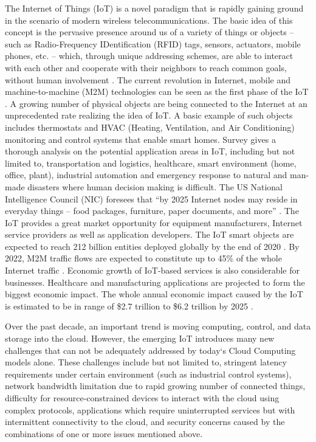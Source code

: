 The Internet of Things (IoT) is a novel paradigm that is rapidly gaining ground in the scenario of modern wireless telecommunications. The basic idea of this concept is the pervasive presence around us of a variety of things or objects -- such as Radio-Frequency IDentification (RFID) tags, sensors, actuators, mobile phones, etc. -- which, through unique addressing schemes, are able to interact with each other and cooperate with their neighbors to reach common goals, without human involvement \cite{Atzori20102787}. The current revolution in Internet, mobile and machine-to-machine (M2M) technologies can be seen as the first phase of the IoT \cite{7123563}.  A growing number of physical objects are being connected to the Internet at an unprecedented rate realizing the idea of IoT. A basic example of such objects includes thermostats and HVAC (Heating, Ventilation, and Air Conditioning) monitoring and control systems that enable smart homes. Survey \cite{Atzori20102787} gives a thorough analysis on the potential application areas in IoT, including but not limited to, transportation and logistics, healthcare, smart environment (home, office, plant), industrial automation and emergency response to natural and man-made disasters where human decision making is difficult. The US National Intelligence Council (NIC) foresees that ``by 2025 Internet nodes may reside in everyday things -- food packages, furniture, paper documents, and more'' \cite{Atzori20102787}. The IoT provides a great market opportunity for equipment manufacturers, Internet service providers as well as application developers. The IoT smart objects are expected to reach 212 billion entities deployed globally by the end of 2020 \cite{gantz2012digital}. By 2022, M2M traffic flows are expected to constitute up to 45\% of the whole Internet traffic \cite{7123563}. Economic growth of IoT-based services is also considerable for businesses. Healthcare and manufacturing applications are projected to form the biggest economic impact. The whole annual economic impact caused by the IoT is estimated to be in range of \$2.7 trillion to \$6.2 trillion by 2025 \cite{7123563}.

Over the past decade, an important trend is moving computing, control, and data storage into the cloud. However, the emerging IoT introduces many new challenges that can not be adequately addressed by today`s Cloud Computing models alone. These challenges \cite{7498684} include but not limited to, stringent latency requirements under certain environment (such as industrial control systems), network bandwidth limitation due to rapid growing number of connected things, difficulty for resource-constrained devices to interact with the cloud using complex protocols, applications which require uninterrupted services but with intermittent connectivity to the cloud, and security concerns caused by the combinations of one or more issues mentioned above.

